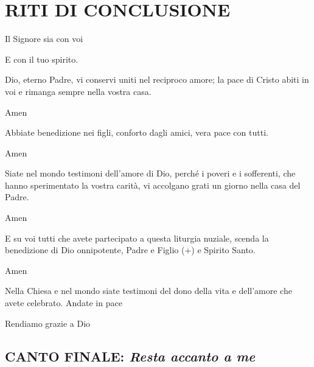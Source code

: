 
\section*{RITI DI CONCLUSIONE}

\begin{dialoghi}
\item[\sacerdote] Il Signore sia con voi
\item[\assemblea] E con il tuo spirito.
\item[\sacerdote] Dio, eterno Padre, vi conservi uniti nel reciproco amore; la pace di Cristo abiti in voi e rimanga sempre nella vostra casa.
\item[\assemblea] Amen
\item[\sacerdote] Abbiate benedizione nei figli, conforto dagli amici, vera pace con tutti.
\item[\assemblea] Amen
\item[\sacerdote] Siate nel mondo testimoni dell'amore di Dio, perché i poveri e i sofferenti, che hanno sperimentato la vostra carità, vi accolgano grati un giorno nella casa del Padre.
\item[\assemblea] Amen
\item[\sacerdote] E su voi tutti che avete partecipato a questa liturgia nuziale, scenda la benedizione di Dio onnipotente, Padre e Figlio (+) e Spirito Santo.
\item[\assemblea] Amen
\item[\sacerdote] Nella Chiesa e nel mondo siate testimoni del dono della vita e dell'amore che avete celebrato. Andate in pace
\item[\assemblea] Rendiamo grazie a Dio
\end{dialoghi}

\subsection*{CANTO FINALE: \textit{Resta accanto a me}}

